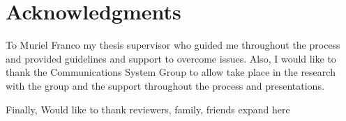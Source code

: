 \chapter*{Acknowledgments}

To Muriel Franco my thesis supervisor who guided me throughout the process and provided guidelines and support to overcome issues. Also, I would like to thank the Communications System Group to allow take place in the research with the group and the support throughout the process and presentations.

Finally, Would like to thank {reviewers, family, friends expand here}